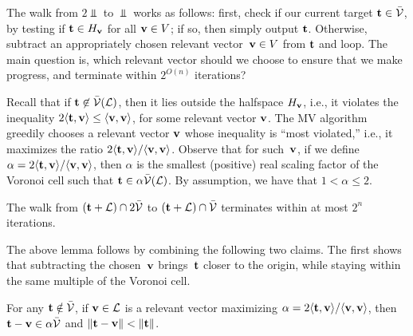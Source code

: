 \documentclass[11pt]{article}
\begin{document}
The walk from $2 \Vbar$ to $\Vbar$ works as follows: first, check if our current target $\mathbf{t} \in \bar{\mathcal{V}}$, by testing if $\mathbf{t} \in H_{\mathbf{v}}$ for all $\mathbf{v} \in V$; if so, then simply output $\mathbf{t}$.
Otherwise, subtract an appropriately chosen relevant vector~$\mathbf{v} \in V$ from $\mathbf{t}$ and loop.
The main question is, which relevant vector should we choose to ensure that we make progress, and terminate within $2^{O(n)}$ iterations?

Recall that if $\mathbf{t} \not\in \bar{\mathcal{V}}(\mathcal{L})$, then it lies outside the halfspace $H_{\mathbf{v}}$, i.e., it violates the inequality $2\langle\mathbf{t}, \mathbf{v}\rangle \leq \langle\mathbf{v}, \mathbf{v}\rangle$, for some relevant vector $\mathbf{v}$.
The MV algorithm greedily chooses a relevant vector $\mathbf{v}$ whose inequality is ``most violated,'' i.e., it maximizes the ratio $2 \langle\mathbf{t}, \mathbf{v}\rangle/\langle\mathbf{v}, \mathbf{v}\rangle$.
Observe that for such~$\mathbf{v}$, if we define $\alpha = 2\langle\mathbf{t}, \mathbf{v}\rangle/\langle\mathbf{v},\mathbf{v}\rangle$, then $\alpha$ is the smallest (positive) real scaling factor of the Voronoi cell such that $\mathbf{t} \in \alpha \bar{\mathcal{V}}(\mathcal{L})$.
By assumption, we have that $1 < \alpha \leq 2$.

\begin{lemma}%
  \label{lem:MV-steps}
  The walk from $(\mathbf{t}+\mathcal{L}) \cap 2\bar{\mathcal{V}}$ to $(\mathbf{t}+\mathcal{L}) \cap \bar{\mathcal{V}}$ terminates within at most $2^{n}$ iterations.
\end{lemma}

The above lemma follows by combining the following two claims.
The first shows that subtracting the chosen~$\mathbf{v}$ brings~$\mathbf{t}$ closer to the origin, while staying within the same multiple of the Voronoi cell.

\begin{claim}%
  \label{clm:MV-progress}
  For any $\mathbf{t} \notin \bar{\mathcal{V}}$, if $\mathbf{v} \in \mathcal{L}$ is a relevant vector maximizing $\alpha = 2 \langle\mathbf{t}, \mathbf{v}\rangle/\langle\mathbf{v}, \mathbf{v}\rangle$, then $\mathbf{t} - \mathbf{v} \in \alpha \bar{\mathcal{V}}$ and $\lVert\mathbf{t} - \mathbf{v}\rVert < \lVert\mathbf{t}\rVert$.
\end{claim}
\end{document}
